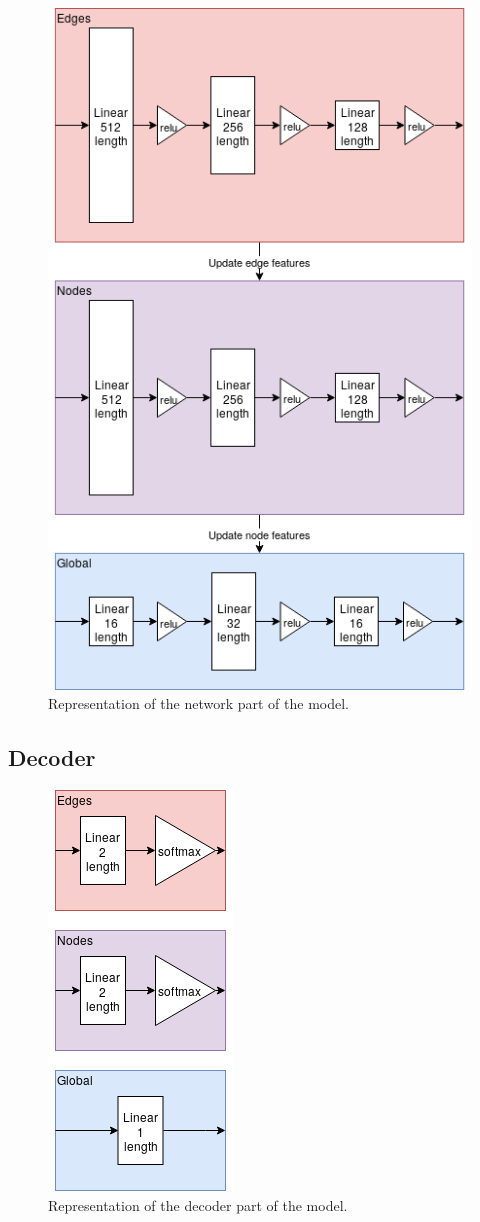 \begin{figure}[!ht]
	\centering
	\includegraphics[scale=0.5]{figures/GA0_network.png}
	\caption{Representation of the network part of the model.}
	\label{fig:graph-attention0-network}
\end{figure}

\subsection{Decoder}

\begin{figure}[!ht]
	\centering
	\includegraphics[scale=0.5]{figures/GA0_decoder.png}
	\caption{Representation of the decoder part of the model.}
	\label{fig:graph-attention0-decoder}
\end{figure}